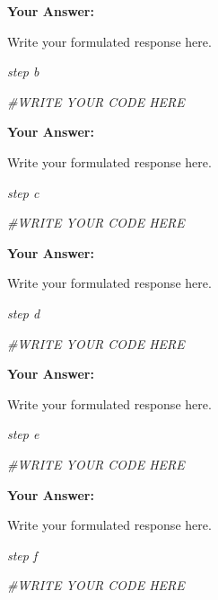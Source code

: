 \documentclass[
]{article}
\newenvironment{Shaded}{\begin{snugshade}}{\end{snugshade}}
\newcommand{\CommentTok}[1]{\textcolor[rgb]{0.56,0.35,0.01}{\textit{#1}}}
\begin{document}
\textbf{Your Answer:}

Write your formulated response here.

\emph{step b}

\begin{Shaded}
\begin{Highlighting}[]
\CommentTok{\#WRITE YOUR CODE HERE}
\end{Highlighting}
\end{Shaded}

\textbf{Your Answer:}

Write your formulated response here.

\emph{step c}

\begin{Shaded}
\begin{Highlighting}[]
\CommentTok{\#WRITE YOUR CODE HERE}
\end{Highlighting}
\end{Shaded}

\textbf{Your Answer:}

Write your formulated response here.

\emph{step d}

\begin{Shaded}
\begin{Highlighting}[]
\CommentTok{\#WRITE YOUR CODE HERE}
\end{Highlighting}
\end{Shaded}

\textbf{Your Answer:}

Write your formulated response here.

\emph{step e}

\begin{Shaded}
\begin{Highlighting}[]
\CommentTok{\#WRITE YOUR CODE HERE}
\end{Highlighting}
\end{Shaded}

\textbf{Your Answer:}

Write your formulated response here.

\emph{step f}

\begin{Shaded}
\begin{Highlighting}[]
\CommentTok{\#WRITE YOUR CODE HERE}
\end{Highlighting}
\end{Shaded}
\end{document}
